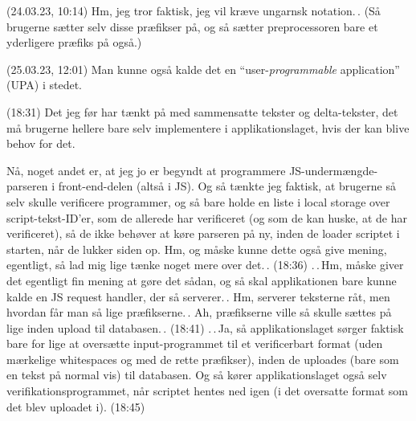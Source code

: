 \documentclass{report}
\begin{document}
(24.03.23, 10:14) Hm, jeg tror faktisk, jeg vil kræve ungarnsk notation.\,. (Så brugerne sætter selv disse præfikser på, og så sætter preprocessoren bare et yderligere præfiks på også.)

(25.03.23, 12:01) Man kunne også kalde det en ``user-\emph{programmable} application'' (UPA) i stedet.

(18:31) Det jeg før har tænkt på med sammensatte tekster og delta-tekster, det må brugerne hellere bare selv implementere i applikationslaget, hvis der kan blive behov for det. 

Nå, noget andet er, at jeg jo er begyndt at programmere JS-undermængde-parseren i front-end-delen (altså i JS). Og så tænkte jeg faktisk, at brugerne så selv skulle verificere programmer, og så bare holde en liste i local storage over script-tekst-ID'er, som de allerede har verificeret (og som de kan huske, at de har verificeret), så de ikke behøver at køre parseren på ny, inden de loader scriptet i starten, når de lukker siden op. Hm, og måske kunne dette også give mening, egentligt, så lad mig lige tænke noget mere over det.\,. (18:36) 
.\,.\,Hm, måske giver det egentligt fin mening at gøre det sådan, og så skal applikationen bare kunne kalde en JS request handler, der så serverer.\,. Hm, serverer teksterne råt, men hvordan får man så lige præfikserne.\,. Ah, præfikserne ville så skulle sættes på lige inden upload til databasen.\,. (18:41) .\,.\,Ja, så applikationslaget sørger faktisk bare for lige at oversætte input-programmet til et verificerbart format (uden mærkelige whitespaces og med de rette præfikser), inden de uploades (bare som en tekst på normal vis) til databasen. Og så kører applikationslaget også selv verifikationsprogrammet, når scriptet hentes ned igen (i det oversatte format som det blev uploadet i). (18:45)
\end{document}
